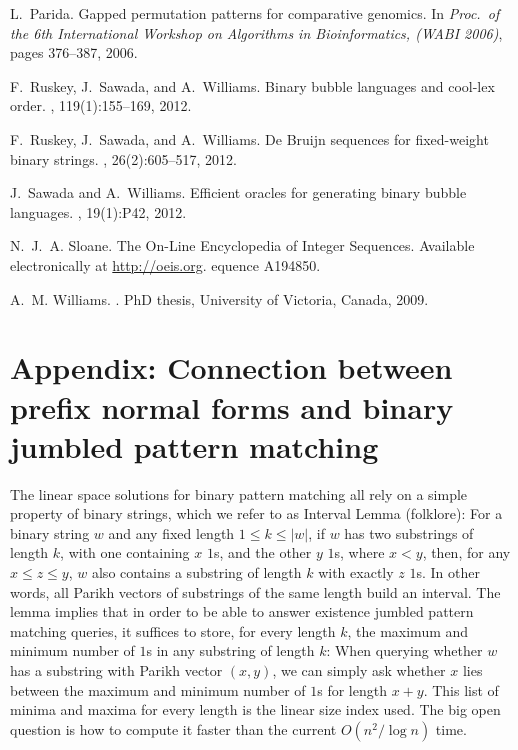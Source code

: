 \documentclass[11pt,a4paper]{llncs}
\renewcommand{\epsilon}{\varepsilon}
\begin{document}
\begin{small}
\begin{thebibliography}{10}
L.~Parida.
\newblock Gapped permutation patterns for comparative genomics.
\newblock In {\em Proc.\ of the 6th International Workshop on Algorithms in
  Bioinformatics, (WABI 2006)}, pages 376--387, 2006.

F.~Ruskey, J.~Sawada, and A.~Williams.
\newblock Binary bubble languages and cool-lex order.
, 119(1):155--169, 2012.

F.~Ruskey, J.~Sawada, and A.~Williams.
\newblock De {Bruijn} sequences for fixed-weight binary strings.
, 26(2):605--517, 2012.

J.~Sawada and A.~Williams.
\newblock Efficient oracles for generating binary bubble languages.
, 19(1):P42, 2012.

N.~J.~A. Sloane.
\newblock The {O}n-{L}ine {E}ncyclopedia of {I}nteger {S}equences.
\newblock Available electronically at \url{http://oeis.org}.
equence {A}194850.

A.~M. Williams.
.
\newblock PhD thesis, University of Victoria, Canada, 2009.

\end{thebibliography}
\end{small}






\section*{Appendix: Connection between prefix normal forms and binary jumbled pattern matching}

\newcommand{\fmax}{F}
\newcommand{\subword}{\sqsubseteq}
\def\pequiv{\sim_P}
\newcommand{\pmax}{\mathop{\rm pmax}}
\newcommand{\pmin}{\mathop{\rm pmin}}
\newcommand{\fmin}{f}
\newcommand{\M}{{\textrm M}}
\renewcommand{\epsilon}{\varepsilon}
\def\P{p}



The linear space solutions for binary pattern matching all rely on a simple property of binary strings, which we refer to as Interval Lemma (folklore): For a binary string $w$ and any fixed length $1\leq k \leq |w|$, if $w$ has two substrings of length $k$, with one containing $x$ $1$s, and the other $y$ $1$s, where $x<y$, then, for any $x\leq z \leq y$, $w$ also contains a substring of length $k$ with exactly $z$ $1$s. In other words, all Parikh vectors of substrings of the same length build an interval. The lemma implies that in order to be able to answer existence jumbled pattern matching queries, it suffices to store, for every length $k$, the maximum and minimum number of $1$s in any substring of length $k$:  When querying whether $w$ has a substring with Parikh vector $(x,y)$, we can simply ask whether $x$ lies between the maximum and minimum number of $1$s for length $x+y$. This list of minima and maxima for every length is the linear size index used. The big open question is how to compute it faster than the current $O(n^2/\log n)$ time. 
\end{document}

